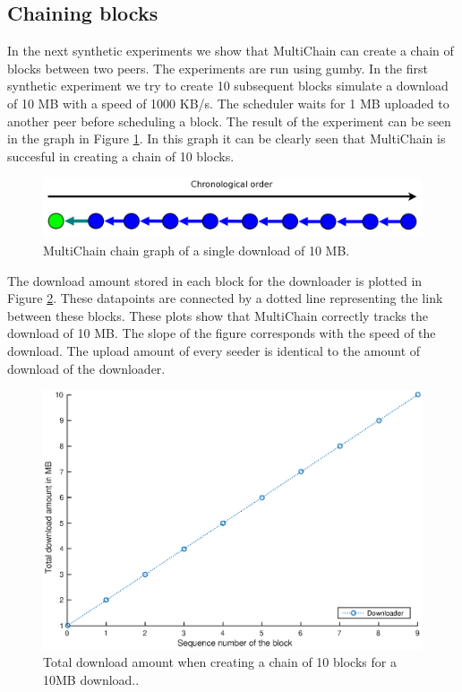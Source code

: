 \subsection{Chaining blocks}
\label{subsect-chain-exp}
In the next synthetic experiments we show that MultiChain can create a chain of blocks between two peers.
The experiments are run using gumby.
In the first synthetic experiment we try to create 10 subsequent blocks simulate a download of 10 MB with a speed of 1000 KB/s.
The scheduler waits for 1 MB uploaded to another peer before scheduling a block.
The result of the experiment can be seen in the graph in Figure \ref{fig:chain-experiment-graph}.
In this graph it can be clearly seen that MultiChain is succesful in creating a chain of 10 blocks.

\begin{figure}[!h]
	\centerline{\includegraphics[scale=0.20]{experimentation/chain/chain.png}}
	\caption{MultiChain chain graph of a single download of 10 MB.}
	\label{fig:chain-experiment-graph}
\end{figure}

The download amount stored in each block for the downloader is plotted in Figure \ref{fig:chain-experiment-amounts-small}.
These datapoints are connected by a dotted line representing the link between these blocks.
These plots show that MultiChain correctly tracks the download of 10 MB.
The slope of the figure corresponds with the speed of the download.
The upload amount of every seeder is identical to the amount of download of the downloader.

\begin{figure}
\centerline{\includegraphics[scale=0.5]{experimentation/chain/small/chain-down.eps}}
\caption{Total download amount when creating a chain of 10 blocks for a 10MB download..}
\label{fig:chain-experiment-amounts-small}
\end{figure}

